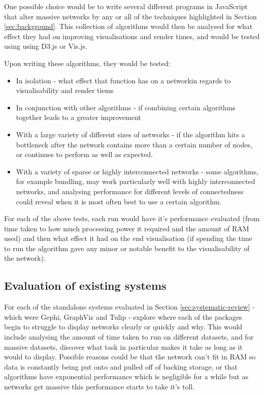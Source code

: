 \documentclass[../dissertation.tex]{subfiles}
\begin{document}
One possible choice would be to write several different programs in JavaScript that alter massive networks by any or all of the techniques highlighted in Section \ref{sec:background}. This collection of algorithms would then be analysed for what effect they had on improving visualisations and render times, and would be tested using using D3.js or Vis.js. 

Upon writing these algorithms, they would be tested:
\begin{itemize}
    \item In isolation - what effect that function has on a networkin regards to visualisability and render tiems
    \item In conjunction with other algorithms - if combining certain algorithms together leads to a greater improvement
    \item With a large variety of different sizes of networks - if the algorithm hits a bottleneck after the network contains more than a certain number of nodes, or continues to perform as well as expected.
    \item With a variety of sparse or highly interconnected networks - some algorithms, for example bundling, may work particularly well with highly interconnected networks, and analysing performance for different levels of connectedness could reveal when it is most often best to use a certain algorithm.
\end{itemize}

For each of the above tests, each run would have it's performance evaluated (from time taken to how much processing power it required and the amount of RAM used) and then what effect it had on the end visualisation (if spending the time to run the algorithm gave any minor or notable benefit to the visualisability of the network).

\subsection{Evaluation of existing systems}

For each of the standalone systems evaluated in Section \ref{sec:systematic-review} - which were Gephi, GraphViz and Tulip - explore where each of the packages begin to struggle to display networks clearly or quickly and why. This would include analysing the amount of time taken to run on different datasets, and for massive datasets, discover what task in particular makes it take as long as it would to display. Possible reasons could be that the network can't fit in RAM so data is constantly being put onto and pulled off of backing storage, or that algorithms have exponential performance which is negligible for a while but as networks get massive this performance starts to take it's toll. 
\end{document}
